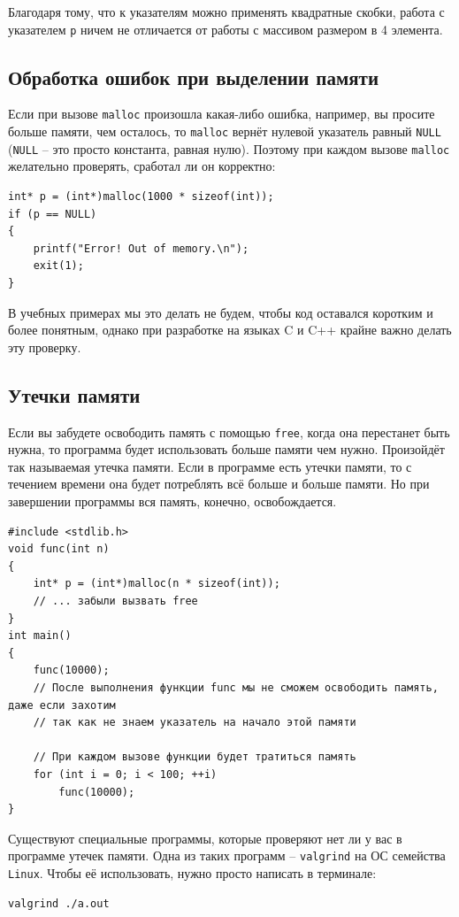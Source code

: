 \documentclass{article}
\begin{document}
Благодаря тому, что к указателям можно применять квадратные скобки, работа с указателем \texttt{p} ничем не отличается от работы с массивом размером в 4 элемента.\\


\subsection*{Обработка ошибок при выделении памяти}
Если при вызове \texttt{malloc} произошла какая-либо ошибка, например, вы просите больше памяти, чем осталось, то \texttt{malloc} вернёт нулевой указатель равный \texttt{NULL} (\texttt{NULL} -- это просто константа, равная нулю). Поэтому при каждом вызове \texttt{malloc} желательно проверять, сработал ли он корректно:
\begin{lstlisting}
int* p = (int*)malloc(1000 * sizeof(int));
if (p == NULL) 
{
    printf("Error! Out of memory.\n");
    exit(1);
}
\end{lstlisting}
В учебных примерах мы это делать не будем, чтобы код оставался коротким и более понятным, однако при разработке на языках C и C++ крайне важно делать эту проверку.

\subsection*{Утечки памяти}
Если вы забудете освободить память с помощью \texttt{free}, когда она перестанет быть нужна, то программа будет использовать больше памяти чем нужно. Произойдёт так называемая утечка памяти. Если в программе есть утечки памяти, то с течением времени она будет потреблять всё больше и больше памяти. Но при завершении программы вся память, конечно, освобождается.
\begin{lstlisting}
#include <stdlib.h>
void func(int n) 
{
    int* p = (int*)malloc(n * sizeof(int));
    // ... забыли вызвать free
}
int main() 
{
    func(10000);
    // После выполнения функции func мы не сможем освободить память, даже если захотим
    // так как не знаем указатель на начало этой памяти
    
    // При каждом вызове функции будет тратиться память
    for (int i = 0; i < 100; ++i)
        func(10000);
}
\end{lstlisting}
Существуют специальные программы, которые проверяют нет ли у вас в программе утечек памяти. Одна из таких программ -- \texttt{valgrind} на ОС семейства \texttt{Linux}. Чтобы её использовать, нужно просто написать в терминале:
\begin{verbatim}
valgrind ./a.out
\end{verbatim}
\end{document}
